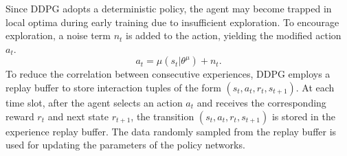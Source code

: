 \documentclass[lettersize,journal]{IEEEtran}
\begin{document}
Since DDPG adopts a deterministic policy, the agent may become trapped in local optima during early training due to insufficient exploration. To encourage exploration, a noise term \( n_t \) is added to the action, yielding the modified action $ a_t $.
\begin{equation}
	\label{equ: obtain action}
	a_t = \mu(s_t|\theta^{\mu}) + n_t.
\end{equation}
To reduce the correlation between consecutive experiences, DDPG employs a replay buffer to store interaction tuples of the form $ (s_t, a_t, r_t, s_{t+1})  $.
At each time slot, after the agent selects an action $ a_t $ and receives the corresponding reward $ r_t $ and next state $ r_{t+1} $, the transition $ (s_t, a_t, r_t, s_{t+1})  $ is stored in the experience replay buffer. 
The  data randomly sampled from the replay buffer is  used for updating the parameters of the policy networks.
\end{document}
